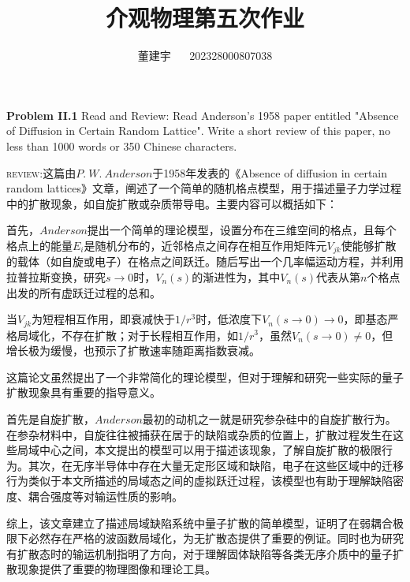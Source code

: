 \documentclass[reqno,a4paper,12pt]{amsart}
\title{介观物理第五次作业}
\author{董建宇 ~~ 202328000807038}
\begin{document}
\maketitle
\titleformat{\section}[hang]{\small}{\thesection}{0.8em}{}{}
\titleformat{\subsection}[hang]{\small}{\thesubsection}{0.8em}{}{}

\textbf{Problem II.1} Read and Review: Read Anderson's 1958 paper entitled "Absence of Diffusion in Certain Random Lattice". Write a short review of this paper, no less than 1000 words or 350 Chinese characters.

\textsc{review:}这篇由$P. \ W. \ Anderson$于1958年发表的《Absence of diffusion in certain random lattices》文章，阐述了一个简单的随机格点模型，用于描述量子力学过程中的扩散现象，如自旋扩散或杂质带导电。主要内容可以概括如下：

首先，$Anderson$提出一个简单的理论模型，设置分布在三维空间的格点，且每个格点上的能量$E_i$是随机分布的，近邻格点之间存在相互作用矩阵元$V_{jk}$使能够扩散的载体（如自旋或电子）在格点之间跃迁。随后写出一个几率幅运动方程，并利用拉普拉斯变换，研究$s\to 0$时，$V_n(s)$的渐进性为，其中$V_n(s)$代表从第$n$个格点出发的所有虚跃迁过程的总和。

当$V_{jk}$为短程相互作用，即衰减快于$1/r^3$时，低浓度下$V_n(s\to 0) \to 0$，即基态严格局域化，不存在扩散；对于长程相互作用，如$1/r^3$，虽然$V_n(s\to 0) \neq 0$，但增长极为缓慢，也预示了扩散速率随距离指数衰减。

这篇论文虽然提出了一个非常简化的理论模型，但对于理解和研究一些实际的量子扩散现象具有重要的指导意义。

首先是自旋扩散，$Anderson$最初的动机之一就是研究参杂硅中的自旋扩散行为。在参杂材料中，自旋往往被捕获在居于的缺陷或杂质的位置上，扩散过程发生在这些局域中心之间，本文提出的模型可以用于描述该现象，了解自旋扩散的极限行为。其次，在无序半导体中存在大量无定形区域和缺陷，电子在这些区域中的迁移行为类似于本文所描述的局域态之间的虚拟跃迁过程，该模型也有助于理解缺陷密度、耦合强度等对输运性质的影响。

综上，该文章建立了描述局域缺陷系统中量子扩散的简单模型，证明了在弱耦合极限下必然存在严格的波函数局域化，为无扩散态提供了重要的例证。同时也为研究有扩散态时的输运机制指明了方向，对于理解固体缺陷等各类无序介质中的量子扩散现象提供了重要的物理图像和理论工具。
\end{document}
